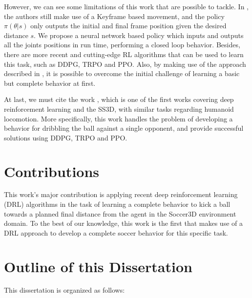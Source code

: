 However, we can see some limitations of this work that are possible to tackle. In \cite{abbas}, the authors still make use of a Keyframe based movement, and the policy $\pi(\theta | s)$ only outputs the initial and final frame position given the desired distance $s$. We propose a neural network based policy which inputs and outputs all the joints positions in run time, performing a closed loop behavior. Besides, there are more recent and cutting-edge RL algorithms that can be used to learn this task, such as DDPG, TRPO and PPO. Also, by making use of the approach described in \cite{deepmimic}, it is possible to overcome the initial challenge of learning a basic but complete behavior at first.

At last, we must cite the work \cite{TGMuzio}, which is one of the first works covering deep reinforcement learning and the SS3D, with similar tasks regarding humanoid locomotion. More specifically, this work handles the problem of developing a behavior for dribbling the ball against a single opponent, and provide successful solutions using DDPG, TRPO and PPO.

\section{Contributions}

This work's major contribution is applying recent deep reinforcement learning (DRL) algorithms in the task of learning a complete behavior to kick a ball towards a planned final distance from the agent in the Soccer3D environment domain. To the best of our knowledge, this work is the first that makes use of a DRL approach to develop a complete soccer behavior for this specific task.

\section{Outline of this Dissertation}

This dissertation is organized as follows:

